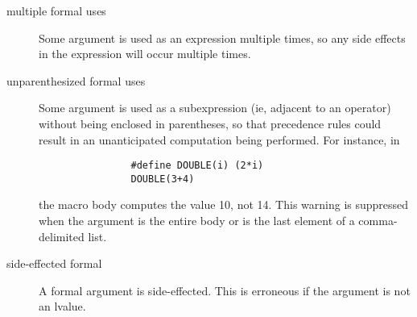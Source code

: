 \begin{description}
\item[multiple formal uses]
        Some argument is used as an expression multiple times, so any side
        effects in the expression will occur multiple times.

\item[unparenthesized formal uses]
        Some argument is used as a subexpression (ie, adjacent to an
        operator) without being enclosed in parentheses, so that precedence
        rules could result in an unanticipated computation being performed.
        For instance, in
\begin{verbatim}
                #define DOUBLE(i) (2*i)
                DOUBLE(3+4)
\end{verbatim}
        the macro body computes the value 10, not 14.
        This warning is suppressed when the argument is the entire body
        or is the last element of a comma-delimited list.

\item[side-effected formal]
        A formal argument is side-effected.  This is erroneous if the
        argument is not an lvalue.
\end{description}



